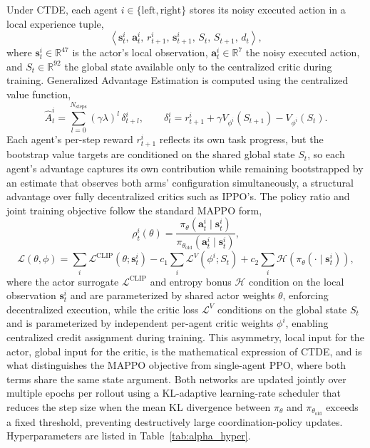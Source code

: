 Under CTDE, each agent $i \in \{\text{left}, \text{right}\}$ stores its noisy executed action in a
local experience tuple,
\begin{equation}
\left\langle \mathbf{s}_t^i,\, \mathbf{a}_t^i,\, r_{t+1}^i,\, \mathbf{s}_{t+1}^i,\, S_t,\, S_{t+1},\, d_t \right\rangle,
\label{eq:alpha_rollout}
\end{equation}
where $\mathbf{s}_t^i \in \mathbb{R}^{47}$ is the actor's local observation, $\mathbf{a}_t^i \in
\mathbb{R}^7$ the noisy executed action, and $S_t \in \mathbb{R}^{92}$ the global state available
only to the centralized critic during training. Generalized Advantage Estimation is computed using
the centralized value function,
\begin{equation}
\hat{A}_t^i = \sum_{l=0}^{N_{\text{steps}}} (\gamma\lambda)^l\, \delta_{t+l}^i, \qquad
\delta_t^i = r_{t+1}^i + \gamma V_{\phi^i}(S_{t+1}) - V_{\phi^i}(S_t).
\label{eq:alpha_gae}
\end{equation}
Each agent's per-step reward $r_{t+1}^i$ reflects its own task progress, but the bootstrap value
targets are conditioned on the shared global state $S_t$, so each agent's advantage captures its
own contribution while remaining bootstrapped by an estimate that observes both arms' configuration
simultaneously, a structural advantage over fully decentralized critics such as IPPO's. The policy
ratio and joint training objective follow the standard MAPPO form,
\begin{equation}
\rho_t^i(\theta) = \frac{\pi_\theta(\mathbf{a}_t^i \mid \mathbf{s}_t^i)}{\pi_{\theta_{\text{old}}}(\mathbf{a}_t^i \mid \mathbf{s}_t^i)},
\label{eq:alpha_ratio}
\end{equation}
\begin{equation}
\mathcal{L}(\theta, \phi) = \sum_{i} \mathcal{L}^{\text{CLIP}}(\theta; \mathbf{s}_t^i)
- c_1 \sum_i \mathcal{L}^V(\phi^i; S_t) + c_2 \sum_i \mathcal{H}\!\left( \pi_\theta(\cdot \mid \mathbf{s}_t^i) \right),
\label{eq:alpha_totalloss}
\end{equation}
where the actor surrogate $\mathcal{L}^{\text{CLIP}}$ and entropy bonus $\mathcal{H}$ condition on
the local observation $\mathbf{s}_t^i$ and are parameterized by shared actor weights $\theta$,
enforcing decentralized execution, while the critic loss $\mathcal{L}^V$ conditions on the global
state $S_t$ and is parameterized by independent per-agent critic weights $\phi^i$, enabling
centralized credit assignment during training. This asymmetry, local input for the actor, global
input for the critic, is the mathematical expression of CTDE, and is what distinguishes the MAPPO
objective from single-agent PPO, where both terms share the same state argument. Both networks are
updated jointly over multiple epochs per rollout using a KL-adaptive learning-rate scheduler that
reduces the step size when the mean KL divergence between $\pi_\theta$ and $\pi_{\theta_{\text{old}}}$
exceeds a fixed threshold, preventing destructively large coordination-policy updates.
Hyperparameters are listed in Table~\ref{tab:alpha_hyper}.

